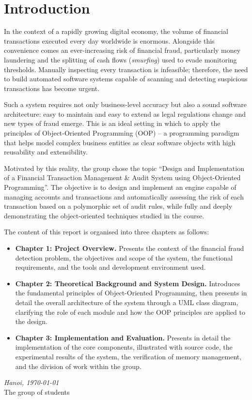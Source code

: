 \chapter*{Introduction}

In the context of a rapidly growing digital economy, the volume of financial transactions executed every day worldwide is enormous. Alongside this convenience comes an ever-increasing risk of financial fraud, particularly money laundering and the splitting of cash flows (\textit{smurfing}) used to evade monitoring thresholds. Manually inspecting every transaction is infeasible; therefore, the need to build automated software systems capable of scanning and detecting suspicious transactions has become urgent.

Such a system requires not only business-level accuracy but also a sound software architecture: easy to maintain and easy to extend as legal regulations change and new types of fraud emerge. This is an ideal setting in which to apply the principles of Object-Oriented Programming (OOP) -- a programming paradigm that helps model complex business entities as clear software objects with high reusability and extensibility.

Motivated by this reality, the group chose the topic ``Design and Implementation of a Financial Transaction Management \& Audit System using Object-Oriented Programming''. The objective is to design and implement an engine capable of managing accounts and transactions and automatically assessing the risk of each transaction based on a polymorphic set of audit rules, while fully and deeply demonstrating the object-oriented techniques studied in the course.

\newpage
The content of this report is organised into three chapters as follows:

\begin{itemize}
    \item \textbf{Chapter 1: Project Overview.} Presents the context of the financial fraud detection problem, the objectives and scope of the system, the functional requirements, and the tools and development environment used.
    \item \textbf{Chapter 2: Theoretical Background and System Design.} Introduces the fundamental principles of Object-Oriented Programming, then presents in detail the overall architecture of the system through a UML class diagram, clarifying the role of each module and how the OOP principles are applied to the design.
    \item \textbf{Chapter 3: Implementation and Evaluation.} Presents in detail the implementation of the core components, illustrated with source code, the experimental results of the system, the verification of memory management, and the division of work within the group.
\end{itemize}

\vspace{1cm}
\hspace{0.5\textwidth}
\begin{minipage}{0.5\textwidth}
	\noindent\begin{center}
		\vspace{0.5cm}
		\textit{Hanoi, \today} \\
		The group of students
	\end{center}	
\end{minipage}
